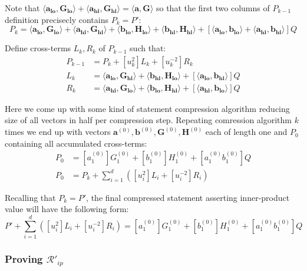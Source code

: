 \documentclass[../lecture-notes-148x210.tex]{subfiles}
\begin{document}
Note that $\langle \mathbf{a_{lo}}, \mathbf{G_{lo}}\rangle + \langle \mathbf{a_{hi}}, \mathbf{G_{hi}}\rangle = \langle \mathbf{a,G}\rangle$ so that the first two columns of $P_{k-1}$ definition precisecly contains $P_{k} = P'$:
$$P_{k} = \langle \mathbf{a_{lo}}, \mathbf{G_{lo}}\rangle + \langle \mathbf{a_{hi}}, \mathbf{G_{hi}}\rangle + \langle \mathbf{b_{lo}}, \mathbf{H_{lo}}\rangle + \langle \mathbf{b_{hi}}, \mathbf{H_{hi}}\rangle + [\langle \mathbf{a_{lo}}, \mathbf{b_{lo}}\rangle + \langle \mathbf{a_{hi}}, \mathbf{b_{hi}}\rangle]Q$$

Define cross-terms $L_k, R_k$ of $P_{k-1}$ such that:
\begin{align}
    P_{k-1} &= P_k + [u_k^2] L_k + [u_k^{-2}] R_k \\
    L_{k} &= \langle \mathbf{a_{lo}}, \mathbf{G_{hi}}\rangle + \langle \mathbf{b_{hi}}, \mathbf{H_{lo}}\rangle + [\langle \mathbf{a_{lo}}, \mathbf{b_{hi}}\rangle]Q \\
    R_{k} &= \langle \mathbf{a_{hi}}, \mathbf{G_{lo}}\rangle + \langle \mathbf{b_{lo}}, \mathbf{H_{hi}}\rangle + [\langle \mathbf{a_{hi}}, \mathbf{b_{lo}}\rangle]Q
\end{align}

Here we come up with some kind of statement compression algorithm reducing size of all vectors in half per compression step. Repeating comression algorithm $k$ times we end up with vectors $\mathbf{a}^{(0)}, \mathbf{b}^{(0)}, \mathbf{G}^{(0)}, \mathbf{H}^{(0)}$ each of length one and $P_0$ containing all accumulated cross-terms:
\begin{align}
    P_0 &= [a_1^{(0)}]G_1^{(0)} + [b_1^{(0)}]H_1^{(0)} + [a_1^{(0)}b_1^{(0)}]Q \\
    P_0 &= P_k + \sum_{i=1}^d ([u_i^2]L_i + [u_i^{-2}]R_i)
\end{align}

Recalling that $P_k = P'$, the final compressed statement asserting inner-product value will have the following form:
$$P' + \sum_{i=1}^d ([u_i^2]L_i + [u_i^{-2}]R_i) = [a_1^{(0)}]G_1^{(0)} + [b_1^{(0)}]H_1^{(0)} + [a_1^{(0)}b_1^{(0)}]Q$$

\subsubsection{Proving $\mathcal{R}'_{ip}$}
\end{document}
